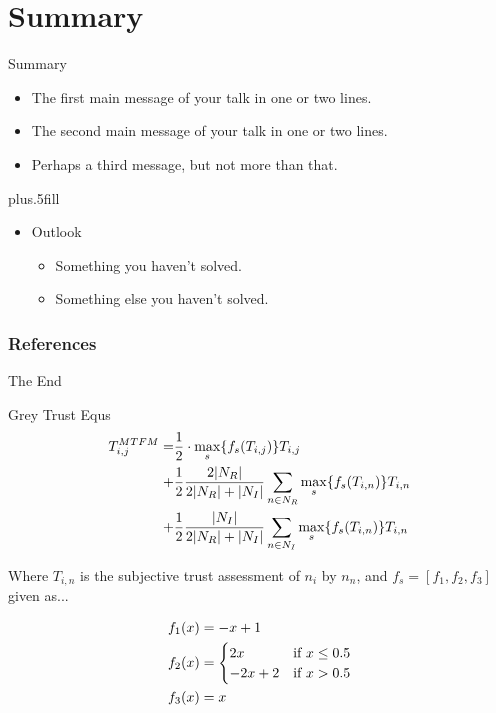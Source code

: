 \documentclass{beamer}
\begin{document}
\section*{Summary}

\begin{frame}{Summary}

  \begin{itemize}
  \item
    The \alert{first main message} of your talk in one or two lines.
  \item
    The \alert{second main message} of your talk in one or two lines.
  \item
    Perhaps a \alert{third message}, but not more than that.
  \end{itemize}
  
  \vskip0pt plus.5fill
  \begin{itemize}
  \item
    Outlook
    \begin{itemize}
    \item
      Something you haven't solved.
    \item
      Something else you haven't solved.
    \end{itemize}
  \end{itemize}
\end{frame}

\begin{frame}[t,allowframebreaks]
  \frametitle{References}
  \printbibliography[title=References]%
\end{frame}

\begin{frame}
  \centerline{The End}
\end{frame}

\begin{frame}[allowframebreaks]{Grey Trust Equs}
  \begin{align}
    \label{eq:networkeffects}
    T_{i,j}^{MTFM}=&\frac{1}{2} \cdot \max_s\{f_s(T_{i,j})\} T_{i,j}\\ \notag
    +&\frac{1}{2} \frac{2|N_R| }{2|N_R| + |N_I|}\sum_{n \in N_R} \max_s\{f_s(T_{i,n})\} T_{i,n}\\ \notag
    +&\frac{1}{2} \frac{|N_I| }{2|N_R| + |N_I|}\sum_{n \in N_I} \max_s\{f_s(T_{i,n})\} T_{i,n} 
  \end{align}

  Where $T_{i,n}$ is the subjective trust assessment of $n_i$ by $n_n$, and $f_s = [ f_1,f_2, f_3]$ given as...

  \framebreak

  \begin{align}
    \label{eq:whitenization}
    f_1(x)&= -x+1\notag\\
    f_2(x)&= 
    \begin{cases}
      2x & \text{if }x\leq 0.5\\
      -2x+2 & \text{if }x>0.5
    \end{cases}\\
    f_3(x)&= x\notag
  \end{align}
\end{frame}
\end{document}
